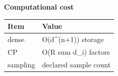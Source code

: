 \begin{center}
\textbf{Computational cost}\par\smallskip
\begin{tabular}{ll}
\toprule
Item & Value \\
\midrule
dense & O(d\^{}(n+1)) storage \\
CP & O(R sum d\_i) factors \\
sampling & declared sample count \\
\bottomrule
\end{tabular}
\end{center}

